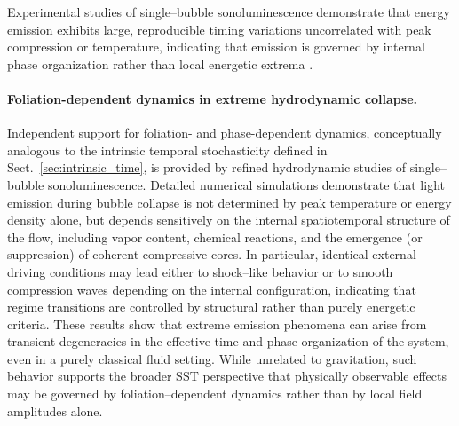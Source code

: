 \documentclass[11pt]{article}
\begin{document}
        Experimental studies of single--bubble sonoluminescence demonstrate that
        energy emission exhibits large, reproducible timing variations uncorrelated
        with peak compression or temperature, indicating that emission is governed
        by internal phase organization rather than local energetic extrema
        \cite{LiYuan2005}.


        \paragraph{Foliation-dependent dynamics in extreme hydrodynamic collapse.}
            Independent support for foliation- and phase-dependent dynamics,
            conceptually analogous to the intrinsic temporal stochasticity defined
            in Sect.~\ref{sec:intrinsic_time}, is provided by refined hydrodynamic
            studies of single--bubble sonoluminescence.
            Detailed numerical simulations demonstrate that light emission
            during bubble collapse is not determined by peak temperature or energy density alone,
            but depends sensitively on the internal spatiotemporal structure of the flow, including
            vapor content, chemical reactions, and the emergence (or suppression) of coherent
            compressive cores. In particular, identical external driving conditions may lead either
            to shock--like behavior or to smooth compression waves depending on the internal
            configuration, indicating that regime transitions are controlled by structural rather
            than purely energetic criteria. These results show that extreme emission phenomena can
            arise from transient degeneracies in the effective time and phase organization of the
            system, even in a purely classical fluid setting. While unrelated to gravitation, such
            behavior supports the broader SST perspective that physically observable effects may be
            governed by foliation--dependent dynamics rather than by local field amplitudes alone.
\end{document}

